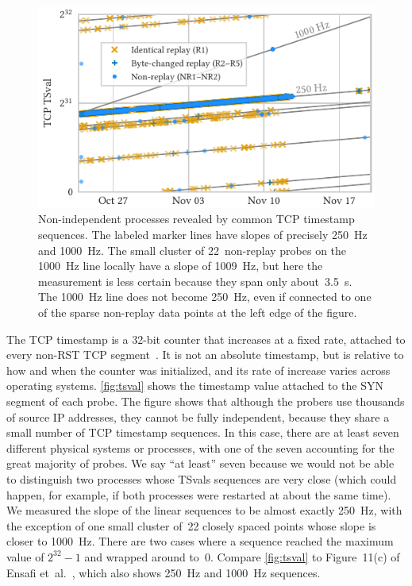 \documentclass[sigconf,letterpaper]{acmart}
\begin{document}
\begin{figure}
    \includegraphics{figures/tsval_lon8.pdf}

    \caption{
    Non-independent processes revealed by
    common TCP timestamp sequences.
    The labeled marker lines have slopes of precisely 250~Hz and 1000~Hz.
    The small cluster of 22~non-replay probes on the 1000~Hz line
    locally have a slope of 1009~Hz,
    but here the measurement is less certain because they span only about~3.5~s.
    The 1000~Hz line does not become 250~Hz, even if connected to one of the sparse non-replay data points at the left edge of the figure.
    }
    \label{fig:tsval}
\end{figure}

The TCP timestamp
is a 32-bit counter that increases at a fixed rate,
attached to every non-RST TCP segment~\cite[\S 3]{rfc7323}.
It is not an absolute timestamp,
but is relative to how and when the counter was initialized,
and its rate of increase varies across operating systems.
\autoref{fig:tsval} shows the timestamp value attached to the SYN segment of each probe.
The figure shows that although the probers use thousands of source IP addresses,
they cannot be fully independent,
because they share a small number of TCP timestamp sequences.
In this case, there are at least seven different physical systems or processes,
with one of the seven accounting for the great majority of probes.
We say ``at least'' seven because we would not be able to distinguish
two processes whose TSvals sequences are very close
(which could happen, for example, if both processes were restarted at about the same time).
We measured the slope of the linear sequences
to be almost exactly 250~Hz,
with the exception of one small cluster of~22 closely spaced points
whose slope is closer to 1000~Hz.
There are two cases where a sequence reached the maximum value of
$2^{32}-1$ and wrapped around to~$0$.
Compare \autoref{fig:tsval} to Figure~11(c) of
Ensafi et~al.~\cite{Ensafi2015b},
which also shows 250~Hz and 1000~Hz sequences.
\end{document}
